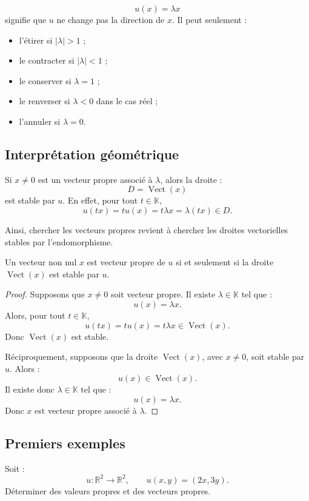 \documentclass[11pt,a4paper]{article}
\newcommand{\K}{\mathbb K}
\newcommand{\R}{\mathbb R}
\newcommand{\Vect}{\operatorname{Vect}}
\begin{document}
\begin{retenirbox}
\[
u(x)=\lambda x
\]
signifie que \(u\) ne change pas la direction de \(x\).  
Il peut seulement :
\begin{itemize}
    \item l'étirer si \(|\lambda|>1\) ;
    \item le contracter si \(|\lambda|<1\) ;
    \item le conserver si \(\lambda=1\) ;
    \item le renverser si \(\lambda<0\) dans le cas réel ;
    \item l'annuler si \(\lambda=0\).
\end{itemize}
\end{retenirbox}

\subsection{Interprétation géométrique}

Si \(x\neq0\) est un vecteur propre associé à \(\lambda\), alors la droite :
\[
D=\Vect(x)
\]
est stable par \(u\).  
En effet, pour tout \(t\in\K\),
\[
u(tx)=t u(x)=t\lambda x=\lambda(tx)\in D.
\]

Ainsi, chercher les vecteurs propres revient à chercher les droites vectorielles stables par l'endomorphisme.

\begin{theorembox}
Un vecteur non nul \(x\) est vecteur propre de \(u\) si et seulement si la droite \(\Vect(x)\) est stable par \(u\).
\end{theorembox}

\begin{proof}
Supposons que \(x\neq0\) soit vecteur propre.  
Il existe \(\lambda\in\K\) tel que :
\[
u(x)=\lambda x.
\]
Alors, pour tout \(t\in\K\),
\[
u(tx)=t u(x)=t\lambda x\in\Vect(x).
\]
Donc \(\Vect(x)\) est stable.

Réciproquement, supposons que la droite \(\Vect(x)\), avec \(x\neq0\), soit stable par \(u\).  
Alors :
\[
u(x)\in\Vect(x).
\]
Il existe donc \(\lambda\in\K\) tel que :
\[
u(x)=\lambda x.
\]
Donc \(x\) est vecteur propre associé à \(\lambda\).
\end{proof}

\subsection{Premiers exemples}

\begin{exercicebox}
Soit :
\[
u:\R^2\to\R^2,
\qquad
u(x,y)=(2x,3y).
\]
Déterminer des valeurs propres et des vecteurs propres.
\end{exercicebox}
\end{document}
